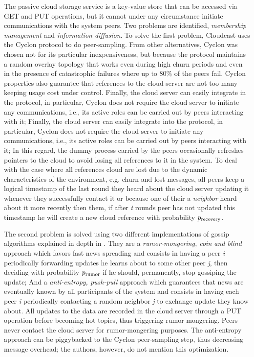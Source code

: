 \documentclass[runningheads]{llncs}
\begin{document}
The passive cloud storage service is a key-value store that can be accessed via GET and PUT operations, but it cannot under any circumstance initiate communications with the system peers. Two problems are identified, \textit{membership management} and \textit{information diffusion}. To solve the first problem, Cloudcast uses the Cyclon protocol to do peer-sampling. From other alternatives, Cyclon was chosen not for its particular inexpensiveness, but because the protocol maintains a random overlay topology that works even during high churn periods and even in the presence of catastrophic failures where up to 80\% of the peers fail. Cyclon properties also guarantee that references to the cloud server are not too many keeping usage cost under control. Finally, the cloud server can easily integrate in the protocol, in particular, Cyclon does not require the cloud server to initiate any communications, i.e., its active roles can be carried out by peers interacting with it; Finally, the cloud server can easily integrate into the protocol, in particular, Cyclon does not require the cloud server to initiate any communications, i.e., its active roles can be carried out by peers interacting with it; In this regard, the dummy process carried by the peers occasionally refreshes pointers to the cloud to avoid losing all references to it in the system. To deal with the case where all references cloud are lost due to the dynamic characteristics of the environment, e.g. churn and lost messages, all peers keep a logical timestamp of the last round they heard about the cloud server updating it whenever they successfully contact it or because one of their a \textit{neighbor} heard about it more recently then them, if after \textit{t} rounds peer has not updated this timestamp he will create a new cloud reference with probability $p\textsubscript{recovery}$.

The second problem is solved using two different implementations of gossip algorithms explained in depth in \cite{epidemic_algorithms}. They are a \textit{rumor-mongering, coin and blind} approach which favors fast news spreading and consists in having a peer \textit{i} periodically forwarding updates he learns about to some other peer \textit{j}, then deciding with probability $p\textsubscript{rumor}$ if he should, permanently, stop gossiping the update; And a \textit{anti-entropy, push-pull} approach which guarantees that news are eventually known by all participants of the system and consists in having each peer \textit{i} periodically contacting a random neighbor \textit{j} to exchange update they know about. All updates to the data are recorded in the cloud server through a PUT operation before becoming hot-topics, thus triggering rumor-mongering. Peers never contact the cloud server for rumor-mongering purposes. The anti-entropy approach can be piggybacked to the Cyclon peer-sampling step, thus decreasing message overhead; the authors, however, do not mention this optimization.
\end{document}
